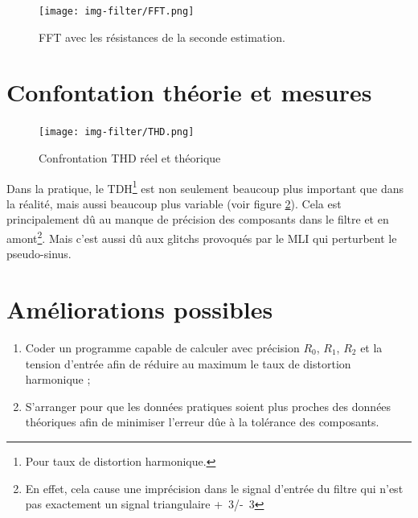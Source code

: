 \begin{figure}[ht]
	\centering
	\texttt{[image: img-filter/FFT.png]}
	\caption{FFT avec les résistances de la seconde estimation.}
	\label{fig:fft-filtre}
\end{figure}

\section{Confontation théorie et mesures}

\begin{figure}[ht]
	\centering
	\texttt{[image: img-filter/THD.png]}
	\caption{Confrontation THD réel et théorique}
	\label{fig:thd-filtre}
\end{figure}

Dans la pratique, le TDH\footnote{Pour taux de distortion harmonique.} 
est non seulement beaucoup plus important que dans la réalité, mais aussi beaucoup plus 
variable (voir figure \ref{fig:thd-filtre}). Cela est principalement dû au manque de précision des composants dans le filtre
et en amont\footnote{En effet, cela cause une imprécision dans le signal d'entrée du filtre
qui n'est pas exactement un signal triangulaire \unit{+3}{\volt}/\unit{-3}{\volt}}. Mais c'est
aussi dû aux glitchs provoqués par le MLI qui perturbent le pseudo-sinus.

\section{Améliorations possibles}

\begin{enumerate}
	\item Coder un programme capable de calculer avec précision $R_0$, $R_1$, $R_2$ et la tension 
				d'entrée afin de réduire au maximum le taux de distortion harmonique ;
	\item S'arranger pour que les données pratiques soient plus proches des données théoriques afin 
				de minimiser l'erreur dûe à la tolérance des composants.
\end{enumerate}